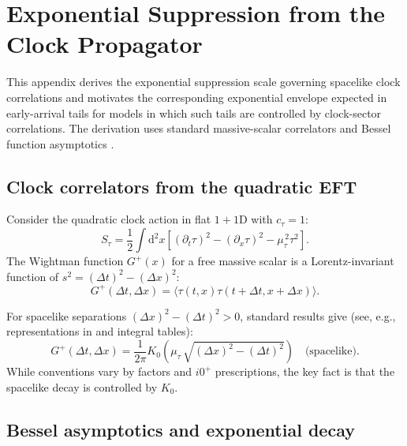 \documentclass[pdflatex,sn-mathphys-num]{sn-jnl}
\theoremstyle{thmstylethree}
\theoremstyle{thmstyleone}
\theoremstyle{thmstyletwo}
\numberwithin{equation}{section}
\newcommand{\dd}{\mathrm{d}}
\newcommand{\Gplus}{G^{+}}
\newcommand{\Kzero}{K_{0}}
\begin{document}
    \section{Exponential Suppression from the Clock Propagator}
    \label{app:prop}
    
    This appendix derives the exponential suppression scale governing spacelike clock correlations and motivates the corresponding exponential envelope expected in early-arrival tails for models in which such tails are controlled by clock-sector correlations. The derivation uses standard massive-scalar correlators and Bessel function asymptotics \cite{Peskin1995,Weinberg1995,GradshteynRyzhik}.
    
    \subsection{Clock correlators from the quadratic EFT}
        
        Consider the quadratic clock action in flat $1+1$D with $c_\tau=1$:
        \begin{equation}
            S_\tau=\frac12\int \dd^2x\left[(\partial_t\tau)^2-(\partial_x\tau)^2-\mu_{\tau}^{\,2}\tau^2\right].
        \end{equation}
        The Wightman function $\Gplus(x)$ for a free massive scalar is a Lorentz-invariant function of $s^2=(\Delta t)^2-(\Delta x)^2$:
        \begin{equation}
            \Gplus(\Delta t,\Delta x)=\langle \tau(t,x)\tau(t+\Delta t,x+\Delta x)\rangle.
        \end{equation}
        
        For spacelike separations $(\Delta x)^2-(\Delta t)^2>0$, standard results give (see, e.g., representations in \cite{Weinberg1995} and integral tables):
        \begin{equation}
            \Gplus(\Delta t,\Delta x)
            =\frac{1}{2\pi}\Kzero\!\left(\mu_\tau\,\sqrt{(\Delta x)^2-(\Delta t)^2}\right)
            \quad\text{(spacelike)}.
            \label{eq:WightmanK0}
        \end{equation}
        While conventions vary by factors and $i0^+$ prescriptions, the key fact is that the spacelike decay is controlled by $\Kzero$.
    
    \subsection{Bessel asymptotics and exponential decay}
        
\end{document}
